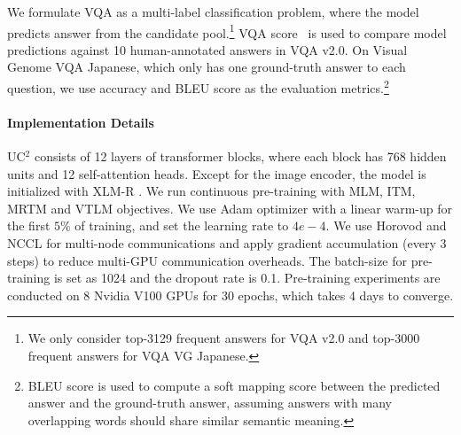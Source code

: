 \documentclass[final]{cvpr}
\newcommand{\shuo}[1]{\textcolor{blue}{\small{\bf [Shuo: #1 ]}}}
\newcommand{\mingyang}[1]{\textcolor{brown}{\small{\bf [Mingyang: #1 ]}}}
\newcommand{\linjie}[1]{\textcolor{asparagus}{\small{\bf [Linjie: #1 ]}}}
\begin{document}
We formulate VQA as a multi-label classification problem, where the model predicts answer from the candidate pool.\footnote{We only consider top-3129 frequent answers for VQA v2.0 and top-3000 frequent answers for VQA VG Japanese.}
VQA score~\cite{vqa_v2} is used to compare model predictions against 10 human-annotated answers in VQA v2.0.
On Visual Genome VQA Japanese, which only has one ground-truth answer to each question, we use accuracy and BLEU score as the evaluation metrics.\footnote{BLEU score is used to compute a soft mapping score between the predicted answer and the ground-truth answer, assuming answers with many overlapping words should share similar semantic meaning.}

\paragraph{Implementation Details}
UC$^2$ consists of 12 layers of transformer blocks, where each block has 768 hidden units and 12 self-attention heads. Except for the image encoder, the model is initialized with XLM-R \cite{XLMR}. We run continuous pre-training with MLM, ITM, MRTM and VTLM objectives. We use Adam optimizer \cite{ADAM} with a linear warm-up for the first $5\%$ of training, and set the learning rate to $4e-4$. We use Horovod and NCCL for multi-node communications and apply gradient accumulation (every 3 steps) to reduce multi-GPU communication overheads. The batch-size for pre-training is set as 1024 and the dropout rate is 0.1. Pre-training experiments are conducted on 8 Nvidia V100 GPUs for 30 epochs, which takes 4 days to converge. 
\end{document}
